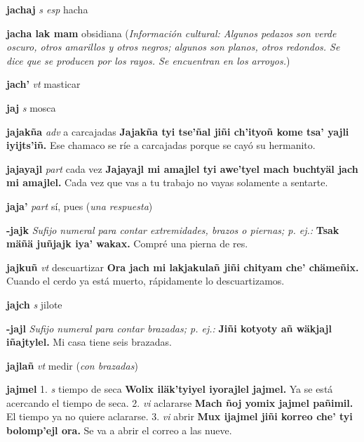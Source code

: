 \documentclass[10pt]{scrbook}
\newcommand{\entry}[1]{\textbf{#1}}
\newcommand{\onedefinition}[1]{#1.}
\newcommand{\nontranslationdef}[1]{\textit{#1}}
\newcommand{\partofspeech}[1]{\textit{#1}}
\newcommand{\spanishtranslation}[1]{#1}
\newcommand{\clarification}[1]{(\textit{#1})}
\newcommand{\cholexample}[1]{\textbf{#1}}
\newcommand{\exampletranslation}[1]{#1}
\newcommand{\culturalinformation}[1]{(\textit{#1})}
\begin{document}
\begin{multicols}{2}
\entry{jachaj}
\partofspeech{s esp}
\spanishtranslation{hacha}

\entry{jacha lak mam}
\spanishtranslation{obsidiana}
\culturalinformation{Información cultural: Algunos pedazos son verde oscuro, otros amarillos y otros negros; algunos son planos, otros redondos. Se dice que se producen por los rayos. Se encuentran en los arroyos.}

\entry{jach'}
\partofspeech{vt}
\spanishtranslation{masticar}

\entry{jaj}
\partofspeech{s}
\spanishtranslation{mosca}

\entry{jajakña}
\partofspeech{adv}
\spanishtranslation{a carcajadas}
\cholexample{Jajakña tyi tse'ñal jiñi ch'ityoñ kome tsa' yajli iyijts'iñ.}
\exampletranslation{Ese chamaco se ríe a carcajadas porque se cayó su hermanito.}

\entry{jajayajl}
\partofspeech{part}
\spanishtranslation{cada vez}
\cholexample{Jajayajl mi amajlel tyi awe'tyel mach buchtyäl jach mi amajlel.}
\exampletranslation{Cada vez que vas a tu trabajo no vayas solamente a sentarte.}

\entry{jaja'}
\partofspeech{part}
\spanishtranslation{sí, pues}
\clarification{una respuesta}

\entry{-jajk}
\nontranslationdef{Sufijo numeral para contar extremidades, brazos o piernas; p. ej.:}
\cholexample{Tsak mäñä juñjajk iya' wakax.}
\exampletranslation{Compré una pierna de res.}

\entry{jajkuñ}
\partofspeech{vt}
\spanishtranslation{descuartizar}
\cholexample{Ora jach mi lakjakulañ jiñi chityam che' chämeñix.}
\exampletranslation{Cuando el cerdo ya está muerto, rápidamente lo descuartizamos.}

\entry{jajch}
\partofspeech{s}
\spanishtranslation{jilote}

\entry{-jajl}
\nontranslationdef{Sufijo numeral para contar brazadas; p. ej.:}
\cholexample{Jiñi kotyoty añ wäkjajl iñajtylel.}
\exampletranslation{Mi casa tiene seis brazadas.}

\entry{jajlañ}
\partofspeech{vt}
\spanishtranslation{medir}
\clarification{con brazadas}

\entry{jajmel}
\onedefinition{1}
\partofspeech{s}
\spanishtranslation{tiempo de seca}
\cholexample{Wolix iläk'tyiyel iyorajlel jajmel.}
\exampletranslation{Ya se está acercando el tiempo de seca.}
\onedefinition{2}
\partofspeech{vi}
\spanishtranslation{aclararse}
\cholexample{Mach ñoj yomix jajmel pañimil.}
\exampletranslation{El tiempo ya no quiere aclararse.}
\onedefinition{3}
\partofspeech{vi}
\spanishtranslation{abrir}
\cholexample{Mux ijajmel jiñi korreo che' tyi bolomp'ejl ora.}
\exampletranslation{Se va a abrir el correo a las nueve.}


\end{multicols}
\end{document}
